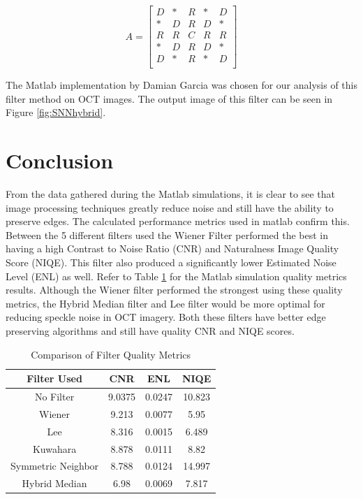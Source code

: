 \documentclass{article}
\begin{document}
$$
A =
\begin{bmatrix}
D & * & R & * & D\\
* & D & R & D & *\\
R & R & C & R & R\\
* & D & R & D & *\\
D & * & R & * & D\\
\end{bmatrix}
$$



The Matlab implementation by Damian Garcia was chosen for our analysis of this filter method on OCT images\cite{garcia_hybrid_2010}. The output image of this filter can be seen in Figure \ref{fig:SNNhybrid}.
\section{\label{sec:level1} Conclusion}
From the data gathered during the Matlab simulations, it is clear to see that image processing techniques greatly reduce noise and still have the ability to preserve edges. The calculated performance metrics used in matlab confirm this. Between the 5 different filters used the Wiener Filter performed the best in having a high Contrast to Noise Ratio (CNR) and Naturalness Image Quality Score (NIQE). This filter also produced a significantly lower Estimated Noise Level (ENL) as well. Refer to Table \ref{tab:compare} for the Matlab simulation quality metrics results. Although the Wiener filter performed the strongest using these quality metrics, the Hybrid Median filter and Lee filter would be more optimal for reducing speckle noise in OCT imagery. Both these filters have better edge preserving algorithms and still have quality CNR and NIQE scores.

\begin{table}[]
  \begin{tabular}{|c|c|c|c|}
    \hline
    Filter Used & CNR & ENL & NIQE \\
    \hline
    No Filter & 9.0375 & 0.0247 & 10.823  \\
    \hline
    Wiener & 9.213 & 0.0077 & 5.95 \\
    \hline
    Lee & 8.316 & 0.0015 & 6.489 \\
    \hline
    Kuwahara & 8.878 & 0.0111 & 8.82 \\
    \hline
    Symmetric Neighbor & 8.788 & 0.0124 & 14.997\\
    \hline
    Hybrid Median  & 6.98 & 0.0069 & 7.817 \\
    \hline
  \end{tabular}
  \caption{Comparison of Filter Quality Metrics}
  \label{tab:compare}
\end{table}
\end{document}
